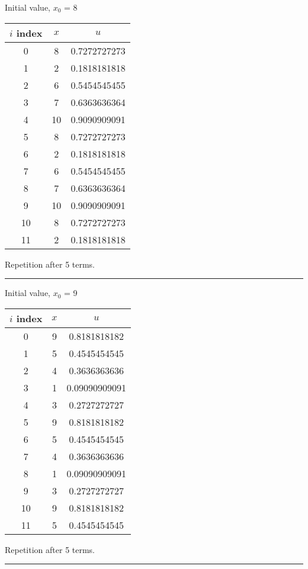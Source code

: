\documentclass{article}
\begin{document}
Initial value, $x_0$ = 8
\begin{center} \begin{tabular}{||c | c | c||}  \hline
		$i$ index & $x$ & $u$ \\ [0.5ex] \hline \hline0 & 8 & 0.7272727273\\
		\hline 
		1 & 2 & 0.1818181818\\
		\hline 
		2 & 6 & 0.5454545455\\
		\hline 
		3 & 7 & 0.6363636364\\
		\hline 
		4 & 10 & 0.9090909091\\
		\hline 
		5 & 8 & 0.7272727273\\
		\hline 
		6 & 2 & 0.1818181818\\
		\hline 
		7 & 6 & 0.5454545455\\
		\hline 
		8 & 7 & 0.6363636364\\
		\hline 
		9 & 10 & 0.9090909091\\
		\hline 
		10 & 8 & 0.7272727273\\
		\hline 
		11 & 2 & 0.1818181818\\
		\hline 
	\end{tabular} 
\end{center} Repetition after 5 terms.
\\ \noindent\rule[0.5ex]{\linewidth}{1pt}
Initial value, $x_0$ = 9
\begin{center} \begin{tabular}{||c | c | c||}  \hline
		$i$ index & $x$ & $u$ \\ [0.5ex] \hline \hline0 & 9 & 0.8181818182\\
		\hline 
		1 & 5 & 0.4545454545\\
		\hline 
		2 & 4 & 0.3636363636\\
		\hline 
		3 & 1 & 0.09090909091\\
		\hline 
		4 & 3 & 0.2727272727\\
		\hline 
		5 & 9 & 0.8181818182\\
		\hline 
		6 & 5 & 0.4545454545\\
		\hline 
		7 & 4 & 0.3636363636\\
		\hline 
		8 & 1 & 0.09090909091\\
		\hline 
		9 & 3 & 0.2727272727\\
		\hline 
		10 & 9 & 0.8181818182\\
		\hline 
		11 & 5 & 0.4545454545\\
		\hline 
	\end{tabular} 
\end{center} Repetition after 5 terms.
\\ \noindent\rule[0.5ex]{\linewidth}{1pt}
\pagebreak
\end{document}
